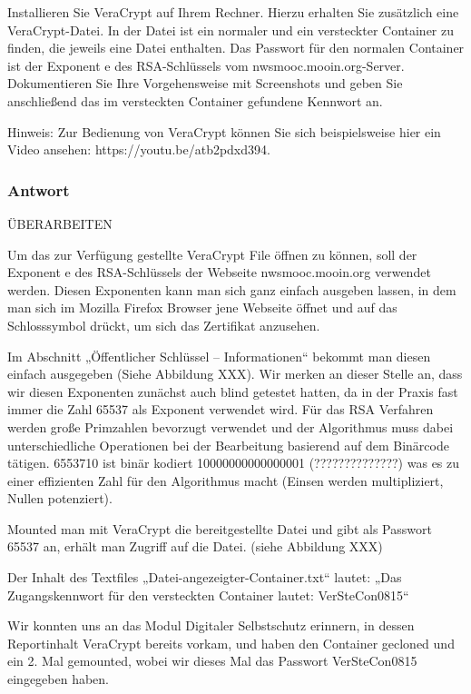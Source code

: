 \documentclass{article}
\begin{document}
Installieren Sie VeraCrypt  auf Ihrem Rechner. Hierzu erhalten Sie zusätzlich eine 
VeraCrypt-Datei. In der Datei ist ein normaler und ein versteckter Container 
zu finden, die jeweils eine Datei enthalten. Das Passwort für den normalen 
Container ist der Exponent e des RSA-Schlüssels vom nwsmooc.mooin.org-Server. 
Dokumentieren Sie Ihre Vorgehensweise mit Screenshots und geben Sie 
anschließend das im versteckten Container gefundene Kennwort an.

Hinweis: Zur Bedienung von VeraCrypt können Sie sich beispielsweise hier ein Video 
ansehen: https://youtu.be/atb2pdxd394.

\subsubsection*{Antwort}

ÜBERARBEITEN

Um das zur Verfügung gestellte VeraCrypt File öffnen zu können, soll der Exponent e 
des RSA-Schlüssels der Webseite nwsmooc.mooin.org verwendet werden. Diesen 
Exponenten kann man sich ganz einfach ausgeben lassen, in dem man sich im Mozilla 
Firefox Browser jene Webseite öffnet und auf das Schlosssymbol drückt, um sich 
das Zertifikat anzusehen.

Im Abschnitt „Öffentlicher Schlüssel – Informationen“ bekommt man diesen einfach 
ausgegeben (Siehe Abbildung XXX). Wir merken an dieser Stelle an, dass wir diesen 
Exponenten zunächst auch blind getestet hatten, da in der Praxis fast immer die 
Zahl 65537 als Exponent verwendet wird. Für das RSA Verfahren werden große 
Primzahlen bevorzugt verwendet und der Algorithmus muss dabei unterschiedliche 
Operationen bei der Bearbeitung basierend auf dem Binärcode tätigen. 6553710 ist 
binär kodiert 10000000000000001 (??????????????)
was es zu einer effizienten Zahl für den Algorithmus macht (Einsen werden 
multipliziert, Nullen potenziert).

Mounted man mit VeraCrypt die bereitgestellte Datei und gibt als Passwort 65537 an, 
erhält man Zugriff auf die Datei. (siehe Abbildung XXX)


Der Inhalt des Textfiles „Datei-angezeigter-Container.txt“ lautet:	„Das 
Zugangskennwort für den versteckten Container lautet: 	VerSteCon0815“

Wir konnten uns an das Modul Digitaler Selbstschutz erinnern, in dessen Reportinhalt 
VeraCrypt bereits vorkam, und haben den Container gecloned und ein 2. Mal gemounted, 
wobei wir dieses Mal das Passwort VerSteCon0815 eingegeben haben.
\end{document}
